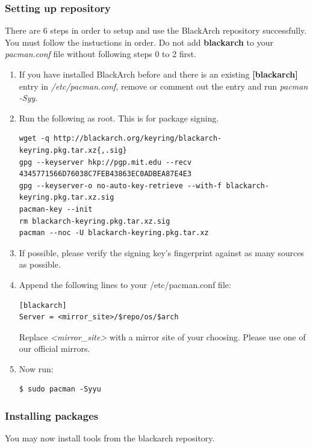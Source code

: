 \documentclass[a4paper, twoside, 11pt]{article}
\begin{document}
\subsubsection{Setting up repository}
There are 6 steps in order to setup and use the BlackArch repository
successfully. You must follow the instuctions in order. Do not add
\textbf{blackarch} to your \textit{pacman.conf} file without following steps 0
to 2 first.
\begin{enumerate}
\item If you have installed BlackArch before and there is an existing
\textbf{[blackarch]} entry in \textit{/etc/pacman.conf}, remove or comment out
the entry and run \textit{pacman -Syy}.
\item Run the following as root. This is for package signing.
{\small
\begin{verbatim}
wget -q http://blackarch.org/keyring/blackarch-keyring.pkg.tar.xz{,.sig}
gpg --keyserver hkp://pgp.mit.edu --recv 4345771566D76038C7FEB43863EC0ADBEA87E4E3
gpg --keyserver-o no-auto-key-retrieve --with-f blackarch-keyring.pkg.tar.xz.sig
pacman-key --init
rm blackarch-keyring.pkg.tar.xz.sig
pacman --noc -U blackarch-keyring.pkg.tar.xz
\end{verbatim}
}
\item If possible, please verify the signing key's fingerprint against as many
sources as possible.
\item Append the following lines to your /etc/pacman.conf file:
{\small
\begin{verbatim}
[blackarch]
Server = <mirror_site>/$repo/os/$arch
\end{verbatim}
}
Replace \textit{\textless mirror\_site\textgreater} with a mirror site of your
choosing. Please use one of our official mirrors.
\item Now run:
{\small
\begin{verbatim}
$ sudo pacman -Syyu
\end{verbatim}
}
\end{enumerate}

\subsubsection{Installing packages}
You may now install tools from the blackarch repository.
\end{document}
